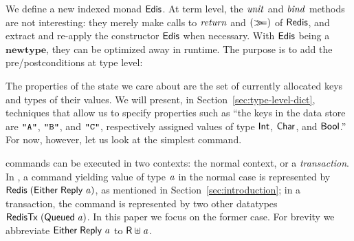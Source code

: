 We define a new indexed monad \ensuremath{\Conid{Edis}}. At term level, the \ensuremath{\Varid{unit}} and \ensuremath{\Varid{bind}}
methods are not interesting: they merely make calls to \ensuremath{\Varid{return}} and \ensuremath{(\bind )} of
\ensuremath{\Conid{Redis}}, and extract and re-apply the constructor \ensuremath{\Conid{Edis}} when necessary.
With \ensuremath{\Conid{Edis}} being a \ensuremath{\mathbf{newtype}}, they can be optimized away in runtime. The
purpose is to add the pre/postconditions at type level:
\resethooks

The properties of the state we care about are the set of currently
allocated keys and types of their values. We will present, in Section~\ref{sec:type-level-dict}, techniques that allow us to specify
properties such as ``the keys in the data store are \ensuremath{\text{\tt \char34 A\char34}}, \ensuremath{\text{\tt \char34 B\char34}}, and \ensuremath{\text{\tt \char34 C\char34}},
respectively assigned values of type \ensuremath{\Conid{Int}}, \ensuremath{\Conid{Char}}, and \ensuremath{\Conid{Bool}}.'' For now,
however, let us look at the simplest \Redis{} command.

\Redis{} commands can be executed in two contexts: the normal context, or a \emph{transaction}. In \Hedis{}, a command yielding value of type \ensuremath{\Varid{a}} in the
normal case is represented by \ensuremath{\Conid{Redis}\;(\Conid{Either}\;\Conid{Reply}\;\Varid{a})}, as mentioned in
Section~\ref{sec:introduction}; in a transaction, the command is represented by
two other datatypes \ensuremath{\Conid{RedisTx}\;(\Conid{Queued}\;\Varid{a})}. In this paper we focus on the former
case. For brevity we abbreviate \ensuremath{\Conid{Either}\;\Conid{Reply}\;\Varid{a}} to \ensuremath{\Conid{R} \uplus \Varid{a}}.

